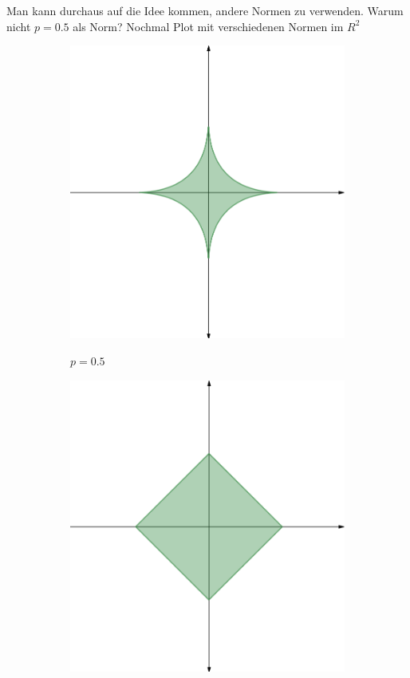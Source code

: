 Man kann durchaus auf die Idee kommen, andere Normen zu verwenden. Warum nicht $p = 0.5$ als Norm? Nochmal Plot mit verschiedenen Normen im $R^2$

\begin{figure}
\centering
	\begin{subfigure}{0.2\textwidth}
	\centering
	\includegraphics[width = \textwidth]{figures/norm_0_5.png}
	\label{norm_0_5_figure}
	\caption*{$p = 0.5$}
	\end{subfigure} \hspace{0.5cm}
	\begin{subfigure}{0.2\textwidth}
	\centering
	\includegraphics[width = \textwidth]{figures/norm_1.png}

\end{subfigure}
\end{figure}

